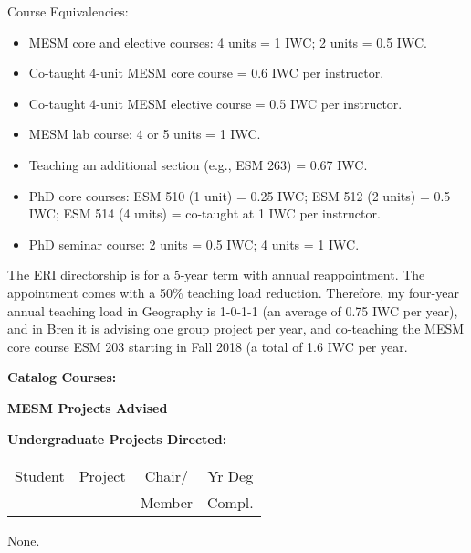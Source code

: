 \documentclass[10pt]{article}
\begin{document}
\begin{enumerate}
{Course Equivalencies:
\begin{itemize}
    \item MESM core and elective courses: 4 units = 1 IWC; 2 units = 0.5 IWC.
    \item Co-taught 4-unit MESM core course = 0.6 IWC per instructor.
    \item Co-taught 4-unit MESM elective course = 0.5 IWC per instructor.
    \item MESM lab course: 4 or 5 units = 1 IWC.
    \item Teaching an additional section (e.g., ESM 263) = 0.67 IWC.
    \item PhD core courses: ESM 510 (1 unit) = 0.25 IWC; ESM 512 (2 units) = 0.5 IWC; ESM 514 (4 units) = co-taught at 1 IWC per instructor.
    \item PhD seminar course: 2 units = 0.5 IWC; 4 units = 1 IWC.
\end{itemize}

\item The ERI directorship is for a 5-year term with annual reappointment.  The appointment comes with a 50\% teaching load reduction. Therefore, my four-year annual teaching load in Geography is 1-0-1-1 (an average of 0.75 IWC per year), and in Bren it is advising one group project per year, and co-teaching the MESM core course ESM 203 starting in Fall 2018 (a total of 1.6 IWC per year.

}
\end{enumerate}


\vspace{0.5cm}
{\bf Catalog Courses:}


\vspace{0.5cm}
{\bf MESM Projects Advised}


\vspace{1cm}
{\bf Undergraduate Projects Directed:}
{\setlength{\extrarowheight}{3.5pt}
\tablehead{}
\begin{supertabular}{lp{11cm}cc} 
Student & Project & Chair/ & Yr Deg \\
 & & Member & Compl. \\
 \hline
\end{supertabular}
}
None.
\end{document}
